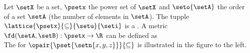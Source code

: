 %
%
\begin{minipage}[c]{40mm}
  \begin{center}%
  
  \end{center}%
\end{minipage}%
\hfill%
\begin{minipage}{\tw-43mm}\raggedright
\begin{example}
\label{ex:norm_d_powerset}
  Let $\setX$ be a set, $\psetx$ the power set of $\setX$
  and $\seto{\setA}$ the order of a set $\setA$ (the number of elements in $\setA$).
  The tupple $\lattice{\psetx}{\subseteq}{\setu}{\seti}$ is a .\footnotemark
  A metric $\fd(\setA,\setB):\psetx\to\R$ can be defined as
  \\
  The  for $\opair{\pset{\setn{x,y,z}}}{\subseteq}$
  is illustrated in the figure to the left.
\end{example}
\end{minipage}
